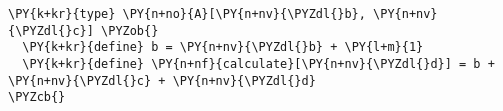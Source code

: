 \begin{Verbatim}[commandchars=\\\{\}]
\PY{k+kr}{type} \PY{n+no}{A}[\PY{n+nv}{\PYZdl{}b}, \PY{n+nv}{\PYZdl{}c}] \PYZob{}
  \PY{k+kr}{define} b = \PY{n+nv}{\PYZdl{}b} + \PY{l+m}{1}
  \PY{k+kr}{define} \PY{n+nf}{calculate}[\PY{n+nv}{\PYZdl{}d}] = b + \PY{n+nv}{\PYZdl{}c} + \PY{n+nv}{\PYZdl{}d}
\PYZcb{}
\end{Verbatim}
